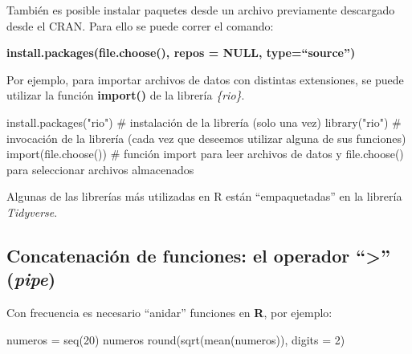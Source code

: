 \documentclass[
  spanish,
  letterpaper,
  DIV=11,
  numbers=noendperiod]{scrreprt}
\newenvironment{Shaded}{\begin{snugshade}}{\end{snugshade}}
\newcommand{\AttributeTok}[1]{\textcolor[rgb]{0.40,0.45,0.13}{#1}}
\newcommand{\CommentTok}[1]{\textcolor[rgb]{0.37,0.37,0.37}{#1}}
\newcommand{\DecValTok}[1]{\textcolor[rgb]{0.68,0.00,0.00}{#1}}
\newcommand{\FunctionTok}[1]{\textcolor[rgb]{0.28,0.35,0.67}{#1}}
\newcommand{\NormalTok}[1]{\textcolor[rgb]{0.00,0.23,0.31}{#1}}
\newcommand{\OtherTok}[1]{\textcolor[rgb]{0.00,0.23,0.31}{#1}}
\newcommand{\StringTok}[1]{\textcolor[rgb]{0.13,0.47,0.30}{#1}}
\begin{document}
\begin{tcolorbox}[enhanced jigsaw, arc=.35mm, bottomrule=.15mm, bottomtitle=1mm, breakable, colback=white, colbacktitle=quarto-callout-note-color!10!white, colframe=quarto-callout-note-color-frame, coltitle=black, left=2mm, leftrule=.75mm, opacityback=0, opacitybacktitle=0.6, rightrule=.15mm, title=\textcolor{quarto-callout-note-color}{\faInfo}\hspace{0.5em}{Nota}, titlerule=0mm, toprule=.15mm, toptitle=1mm]

También es posible instalar paquetes desde un archivo previamente
descargado desde el CRAN. Para ello se puede correr el comando:

\textbf{install.packages(file.choose(), repos = NULL, type=``source'')}

\end{tcolorbox}

Por ejemplo, para importar archivos de datos con distintas extensiones,
se puede utilizar la función \textbf{import()} de la librería
\emph{\{rio\}}.

\begin{Shaded}
\begin{Highlighting}[]
\FunctionTok{install.packages}\NormalTok{(}\StringTok{"rio"}\NormalTok{) }\CommentTok{\# instalación de la librería (solo una vez)}
\FunctionTok{library}\NormalTok{(}\StringTok{"rio"}\NormalTok{) }\CommentTok{\# invocación de la librería (cada vez que deseemos utilizar alguna de sus funciones)}
\FunctionTok{import}\NormalTok{(}\FunctionTok{file.choose}\NormalTok{()) }\CommentTok{\# función import para leer archivos de datos y file.choose() para seleccionar archivos almacenados}
\end{Highlighting}
\end{Shaded}

Algunas de las librerías más utilizadas en R están ``empaquetadas'' en
la librería \emph{Tidyverse}.

\subsection{\texorpdfstring{Concatenación de funciones: el operador
``\textbar\textgreater{}''
(\emph{pipe})}{Concatenación de funciones: el operador ``\textbar\textgreater'' (pipe)}}\label{concatenaciuxf3n-de-funciones-el-operador-pipe}

Con frecuencia es necesario ``anidar'' funciones en \textbf{R}, por
ejemplo:

\begin{Shaded}
\begin{Highlighting}[]

\NormalTok{numeros }\OtherTok{=} \FunctionTok{seq}\NormalTok{(}\DecValTok{20}\NormalTok{)}
\NormalTok{numeros}
\FunctionTok{round}\NormalTok{(}\FunctionTok{sqrt}\NormalTok{(}\FunctionTok{mean}\NormalTok{(numeros)), }\AttributeTok{digits =} \DecValTok{2}\NormalTok{)}
\end{Highlighting}
\end{Shaded}
\end{document}
